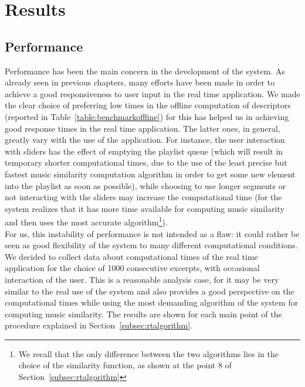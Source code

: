 \chapter{Results} 

\label{Chapter7} 


\section{Performance}
Performance has been the main concern in the development of the system. As already seen in previous chapters, many efforts have been made in order to achieve a good responsiveness to user input in the real time application. We made the clear choice of preferring low times in the offline computation of descriptors (reported in Table~\ref{table:benchmarkoffline}) for this has helped us in achieving good response times in the real time application. The latter ones, in general, greatly vary with the use of the application. For instance, the user interaction with sliders has the effect of emptying the playlist queue (which will result in temporary shorter computational times, due to the use of the least precise but fastest music similarity computation algorithm in order to get some new element into the playlist as soon as possible), while choosing to use longer segments or not interacting with the sliders may increase the computational time (for the system realizes that it has more time available for computing music similarity and then uses the most accurate algorithm\footnote{We recall that the only difference between the two algorithms lies in the choice of the similarity function, as shown at the point 8 of Section~\ref{subsec:rtalgorithm}}). \\
For us, this instability of performance is not intended as a flaw: it could rather be seen as good flexibility of the system to many different computational conditions.\\
We decided to collect data about computational times of the real time application for the choice of 1000 consecutive excerpts, with occasional interaction of the user. This is a reasonable analysis case, for it may be very similar to the real use of the system and also provides a good perspective on the computational times while using the most demanding algorithm of the system for computing music similarity. The results are shown for each main point of the procedure explained in Section~\ref{subsec:rtalgorithm}.\\

